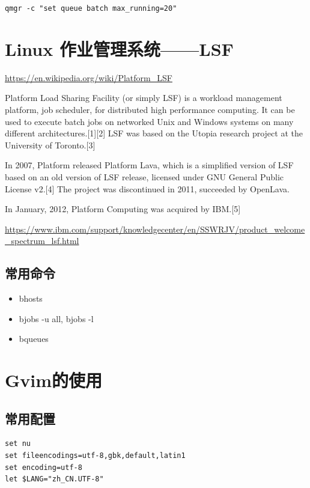 {\verb|qmgr -c "set queue batch max_running=20"|







\section{Linux 作业管理系统——LSF}
\url{https://en.wikipedia.org/wiki/Platform_LSF}

Platform Load Sharing Facility (or simply LSF) is a workload management platform, job scheduler, for distributed high performance computing. It can be used to execute batch jobs on networked Unix and Windows systems on many different architectures.[1][2] LSF was based on the Utopia research project at the University of Toronto.[3]

In 2007, Platform released Platform Lava, which is a simplified version of LSF based on an old version of LSF release, licensed under GNU General Public License v2.[4] The project was discontinued in 2011, succeeded by OpenLava.

In January, 2012, Platform Computing was acquired by IBM.[5]


\url{https://www.ibm.com/support/knowledgecenter/en/SSWRJV/product_welcome_spectrum_lsf.html}



\subsection{常用命令}
\begin{itemize}
\item bhosts
\item bjobs -u all, bjobs -l
\item bqueues
\end{itemize}







\section{Gvim的使用}
\subsection{常用配置}
\begin{verbatim}
set nu
set fileencodings=utf-8,gbk,default,latin1
set encoding=utf-8
let $LANG="zh_CN.UTF-8"
\end{verbatim}


}
